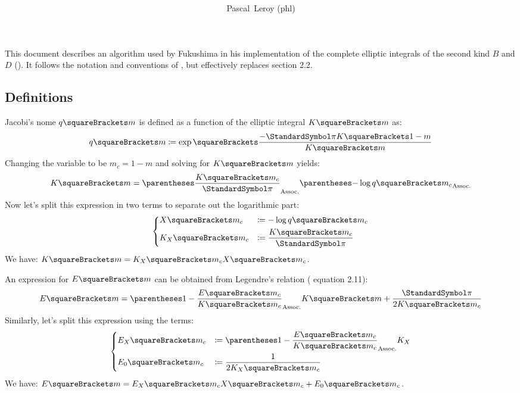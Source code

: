 \documentclass[10pt, a4paper, twoside]{basestyle}
\title{%
\textdisplay{%
On an Algorithm by Fukushima%
}%
}
\author{Pascal~Leroy (phl)}
\begin{document}
\maketitle
\begin{sloppypar}
\noindent
This document describes an algorithm used by Fukushima in his implementation of the complete elliptic integrals of the second kind $B$ and $D$ (\cite{Fukushima2018}).  It
follows the notation and conventions of \cite{Fukushima2011a}, but effectively replaces section 2.2.
\end{sloppypar}

\subsection*{Definitions}
Jacobi's nome $q\of{m}$ is defined as a function of the elliptic integral $K\of{m}$ as:
\[
q\of{m} \DefineAs\exp\of{\frac{-\Pi K\of{1 - m}}{K\of{m}}}
\]
Changing the variable to be $m_c = 1 - m$ and solving for $K\of{m}$ yields:
\[
K\of{m} = \pa{\frac{K\of{m_c}}{\Pi}}\pa{-\log q\of{m_c}}
\]
Now let's split this expression in two terms to separate out the logarithmic part:
\[
\begin{dcases}
X\of{m_c} &\DefineAs -\log q\of{m_c}\\
K_X\of{m_c} &\DefineAs \frac{K\of{m_c}}{\Pi}
\end{dcases}
\]
We have: $K\of{m} = K_X\of{m_c} X\of{m_c}$.

An expression for $E\of{m}$ can be obtained from Legendre's relation (\cite{Fukushima2011a} equation 2.11):
\[
E\of{m} = \pa{1 - \frac{E\of{m_c}}{K\of{m_c}}} K\of{m} + \frac{\Pi}{2 K\of{m_c}}
\]
Similarly, let's split this expression using the terms:
\[
\begin{dcases}
E_X\of{m_c} &\DefineAs \pa{1 - \frac{E\of{m_c}}{K\of{m_c}}}K_X\\
E_0\of{m_c} &\DefineAs \frac{1}{2 K_X\of{m_c}}
\end{dcases}
\]
We have: $E\of{m} = E_X\of{m_c} X\of{m_c} + E_0\of{m_c}$.
\end{document}
